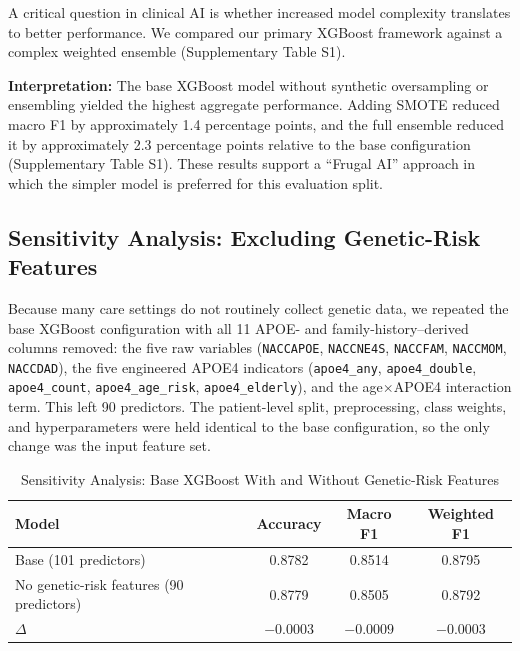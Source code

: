 \documentclass[preprint,12pt]{elsarticle}
\begin{document}
A critical question in clinical AI is whether increased model complexity translates to better performance. We compared our primary XGBoost framework against a complex weighted ensemble (Supplementary Table S1).

\textbf{Interpretation:} The base XGBoost model without synthetic oversampling or ensembling yielded the highest aggregate performance. Adding SMOTE reduced macro F1 by approximately 1.4 percentage points, and the full ensemble reduced it by approximately 2.3 percentage points relative to the base configuration (Supplementary Table S1). These results support a ``Frugal AI'' approach in which the simpler model is preferred for this evaluation split.

\subsection{Sensitivity Analysis: Excluding Genetic-Risk Features}
\label{sec:sensitivity}

Because many care settings do not routinely collect genetic data, we repeated the base XGBoost configuration with all 11 APOE- and family-history--derived columns removed: the five raw variables (\texttt{NACCAPOE}, \texttt{NACCNE4S}, \texttt{NACCFAM}, \texttt{NACCMOM}, \texttt{NACCDAD}), the five engineered APOE4 indicators (\texttt{apoe4\_any}, \texttt{apoe4\_double}, \texttt{apoe4\_count}, \texttt{apoe4\_age\_risk}, \texttt{apoe4\_elderly}), and the age$\times$APOE4 interaction term. This left 90 predictors. The patient-level split, preprocessing, class weights, and hyperparameters were held identical to the base configuration, so the only change was the input feature set.

\begin{table}[htbp]
\caption{Sensitivity Analysis: Base XGBoost With and Without Genetic-Risk Features}
\label{tab:sensitivity}
\begin{center}
\begin{tabular}{lccc}
\toprule
\textbf{Model} & \textbf{Accuracy} & \textbf{Macro F1} & \textbf{Weighted F1} \\
\midrule
Base (101 predictors) & 0.8782 & 0.8514 & 0.8795 \\
No genetic-risk features (90 predictors) & 0.8779 & 0.8505 & 0.8792 \\
\midrule
$\Delta$ & $-0.0003$ & $-0.0009$ & $-0.0003$ \\
\bottomrule
\end{tabular}
\end{center}
\end{table}
\end{document}

